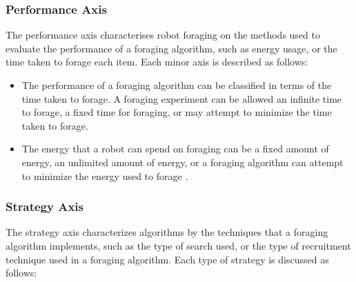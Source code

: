 \subsubsection{Performance Axis}
The performance axis characterises robot foraging on the methods used to evaluate the performance of a foraging algorithm, such as energy usage, or the time taken to forage each item. Each minor axis is described as follows:

\begin{itemize}
\item The performance of a foraging algorithm can be classified in terms of the time taken to forage. A foraging experiment can be allowed an infinite time to forage, a fixed time for foraging, or may attempt to minimize the time taken to forage.
\item The energy that a robot can spend on foraging can be a fixed amount of energy, an unlimited amount of energy, or a foraging algorithm can attempt to minimize the energy used to forage \cite{liu2006strategies}.
\end{itemize}

\subsubsection{Strategy Axis}
The strategy axis characterizes algorithms by the techniques that a foraging algorithm implements, such as the type of search used, or the type of recruitment technique used in a foraging algorithm. Each type of strategy is discussed as follows:


